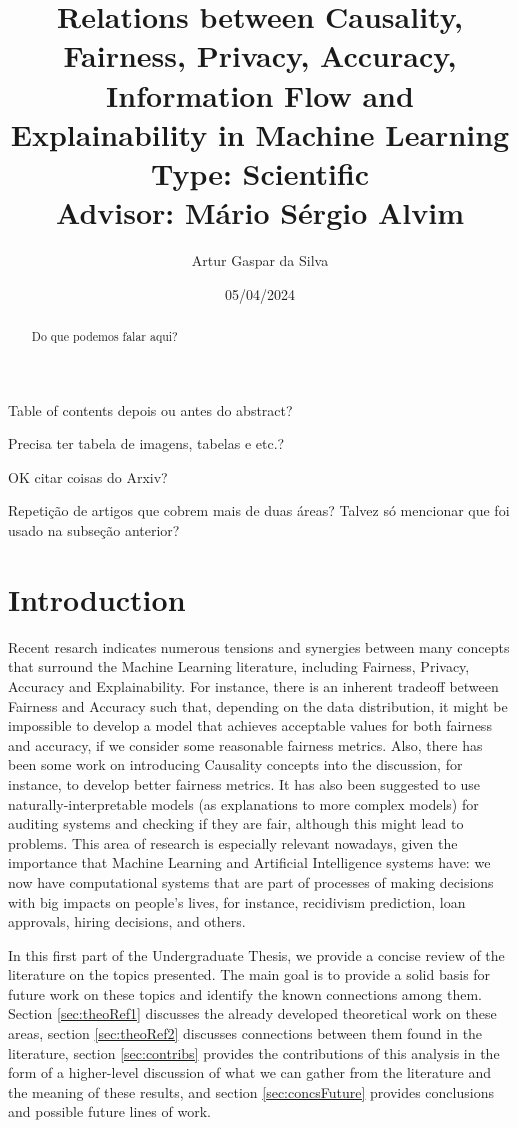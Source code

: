 \documentclass{article}
\title{Relations between Causality, Fairness, Privacy, Accuracy, Information Flow and Explainability in Machine Learning\large\\ Type: Scientific\\Advisor: Mário Sérgio Alvim}
\author{Artur Gaspar da Silva}
\date{05/04/2024}
\begin{document}
\maketitle

{\color{orange} Table of contents depois ou antes do abstract?}

{\color{orange} Precisa ter tabela de imagens, tabelas e etc.?}

{\color{orange} OK citar coisas do Arxiv?}

{\color{orange} Repetição de artigos que cobrem mais de duas áreas? Talvez só mencionar que foi usado na subseção anterior?}

\begin{abstract}
    Do que podemos falar aqui?
\end{abstract}

\tableofcontents

\section{Introduction}

Recent resarch\cite{Sok}\cite{Reductions}\cite{Rachel}\cite{Awareness} indicates numerous tensions and synergies between many concepts that surround the Machine Learning literature, including Fairness, Privacy, Accuracy and Explainability. For instance, there is an inherent tradeoff between Fairness and Accuracy such that, depending on the data distribution, it might be impossible to develop a model that achieves acceptable values for both fairness and accuracy, if we consider some reasonable fairness metrics\cite{Carlos}. Also, there has been some work on introducing Causality concepts into the discussion, for instance, to develop better fairness metrics\cite{CausalFair}. It has also been suggested to use naturally-interpretable models (as explanations to more complex models) for auditing systems and checking if they are fair, although this might lead to problems\cite{ExplainAll}. This area of research is especially relevant nowadays, given the importance that Machine Learning and Artificial Intelligence systems have: we now have computational systems that are part of processes of making decisions with big impacts on people's lives, for instance, recidivism prediction\cite{Compass}, loan approvals\cite{Loans}, hiring decisions\cite{Jobs}, and others.

In this first part of the Undergraduate Thesis, we provide a concise review of the literature on the topics presented. The main goal is to provide a solid basis for future work on these topics and identify the known connections among them. Section \ref{sec:theoRef1} discusses the already developed theoretical work on these areas, section \ref{sec:theoRef2} discusses connections between them found in the literature, section \ref{sec:contribs} provides the contributions of this analysis in the form of a higher-level discussion of what we can gather from the literature and the meaning of these results, and section \ref{sec:concsFuture} provides conclusions and possible future lines of work. 
\end{document}
